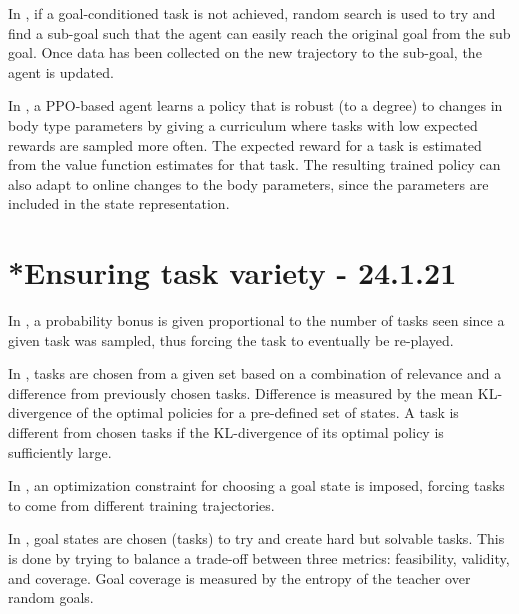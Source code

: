 \documentclass[letterpaper]{article}
\theoremstyle{definition}
\begin{document}
In \cite{Li}, if a goal-conditioned task is not achieved, random search is used to try and find a sub-goal such that the agent can easily reach the original goal from the sub goal. Once data has been collected on the new trajectory to the sub-goal, the agent is updated.

In \cite{Won2019}, a PPO-based agent learns a policy that is robust (to a degree) to changes in body type parameters by giving a curriculum where tasks with low expected rewards are sampled more often. 
The expected reward for a task is estimated from the value function estimates for that task. The resulting trained policy can also adapt to online changes to the body parameters, since the parameters are included in the state representation.

\section{*Ensuring task variety - 24.1.21} \label{sec:variety}

In \cite{Jiang2020}, a probability bonus is given proportional to the number of tasks seen since a given task was sampled, thus forcing the task to eventually be re-played.

In \cite{Gutierrez2020}, tasks are chosen from a given set based on a combination of relevance and a difference from previously chosen tasks. Difference is measured by the mean KL-divergence of the optimal policies for a pre-defined set of states. A task is different from chosen tasks if the KL-divergence of its optimal policy is sufficiently large.

In \cite{Reny2019}, an optimization constraint for choosing a goal state is imposed, forcing tasks to come from different training trajectories.

In \cite{Racaniere2019}, goal states are chosen (tasks) to try and create hard but solvable tasks. 
This is done by trying to balance a trade-off between three metrics: feasibility, validity, and coverage.
Goal coverage is measured by the entropy of the teacher over random goals.
\end{document}
